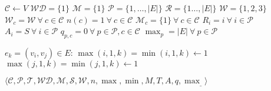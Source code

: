 \begin{codebox}
\li $\mathcal{C} \gets V$
\li $\mathcal{WD} = \{1\}$
\li $\mathcal{M} = \{1\}$
\li $\mathcal{P} = \{1, \dots, |E|\}$
\li $\mathcal{R} = \{1 \dots, |E|\}$
\li $\mathcal{W} = \{1, 2, 3\}$
\li $\mathcal{W}_c = \mathcal{W}\ \forall\ c \in \mathcal{C}$
\li $n(c) = 1\ \forall\ c \in \mathcal{C}$
\li $\mathcal{M}_c = \{1\}\ \forall\ c \in \mathcal{C}$
\li $R_i = i\ \forall\ i \in \mathcal{P}$
\li $A_i = S\ \forall\ i \in \mathcal{P}$
\li $q_{p, c} = 0\ \forall\ p \in \mathcal{P}, c \in \mathcal{C}$
\li $\max_p = |E|\ \forall\ p \in \mathcal{P}$

\li \For $e_k = (v_i, v_j) \in E$:
\li \Do $\max(i, 1, k) = \min(i, 1, k) \gets 1$
\li     $\max(j, 1, k) = \min(j, 1, k) \gets 1$
    \End

    \li \Return $\langle \mathcal{C}, \mathcal{P}, \mathcal{T}, \mathcal{WD}, \mathcal{M}, \mathcal{S}, \mathcal{W}, n, \max, \min, M, T, A, q, \max_{\_} \rangle$
\end{codebox}
